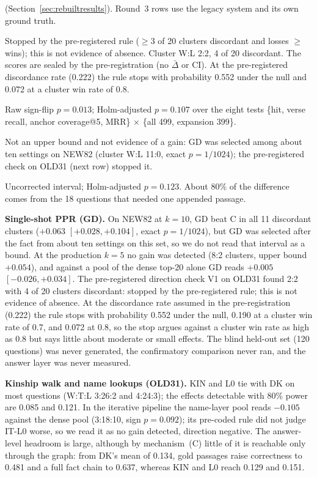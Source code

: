 \begin{table}[p]
\begin{threeparttable}
\begin{tablenotes}
(Section~\ref{sec:rebuiltresults}). Round~3 rows use the legacy system
and its own ground truth.
\item[a] Stopped by the pre-registered rule ($\ge 3$ of 20 clusters
discordant and losses $\ge$ wins); this is not evidence of absence.
Cluster W:L 2:2, 4 of 20 discordant. The scores are sealed by the
pre-registration (no $\bar{\Delta}$ or CI). At the pre-registered
discordance rate (0.222) the rule stops with probability 0.552 under the null and 0.072
at a cluster win rate of 0.8.
\item[b] Raw sign-flip $p=0.013$; Holm-adjusted $p=0.107$ over the eight
tests \{hit, verse recall, anchor coverage@5, MRR\} $\times$ \{all 499,
expansion 399\}.
\item[c] Not an upper bound and not evidence of a gain: GD was selected
among about ten settings on NEW82 (cluster W:L 11:0, exact
$p=1/1024$); the pre-registered check on OLD31 (next row) stopped it.
\item[d] Uncorrected interval; Holm-adjusted $p=0.123$. About 80\% of the
difference comes from the 18 questions that needed one appended passage.
\end{tablenotes}
\end{threeparttable}
\end{table}

\textbf{Single-shot PPR (GD).} On NEW82 at $k=10$, GD beat C in all 11
discordant clusters ($+0.063$ $[+0.028, +0.104]$, exact $p=1/1024$), but
GD was selected after the fact from about ten settings on this set, so we
do not read that interval as a bound. At the production $k=5$ no gain was
detected (8:2 clusters, upper bound $+0.054$), and against a pool of the
dense top-20 alone GD reads $+0.005$ $[-0.026, +0.034]$. The
pre-registered direction check V1 on OLD31 found 2:2 with 4 of 20 clusters
discordant: stopped by the pre-registered rule; this is not evidence of
absence. At the discordance rate assumed in the pre-registration (0.222)
the rule stops with probability 0.552 under the null, 0.190 at a cluster win rate of 0.7, and 0.072 at
0.8, so the stop argues against a cluster win rate as high as 0.8 but
says little about moderate or small effects. The blind
held-out set (120 questions) was never generated, the confirmatory
comparison never ran, and the answer layer was never measured.

\textbf{Kinship walk and name lookups (OLD31).} KIN and L0 tie with DK
on most questions (W:T:L 3:26:2 and 4:24:3); the effects detectable with
80\% power are 0.085 and 0.121. In the iterative pipeline the name-layer
pool reads $-0.105$ against the dense pool (3:18:10, sign $p=0.092$); its
pre-coded rule did not judge IT-L0 worse, so we read it as no gain
detected, direction negative. The answer-level headroom is large,
although by mechanism~(C) little of it is reachable only through the
graph: from DK's mean of
0.134, gold passages raise correctness to 0.481 and a full fact chain to
0.637, whereas KIN and L0 reach 0.129 and 0.151.

